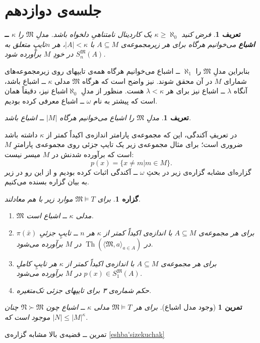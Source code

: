 \documentclass[12pt,a4paper]{report}
\theoremstyle{colorhead}
\newtheorem{tam}{تمرین}
\newtheorem{prop}[thm]{گزاره}
\newtheorem{defn}[thm]{تعریف}
\DeclareMathOperator{\Th}{Th}
\begin{document}
\section{جلسه‌ی دوازدهم}
\begin{defn}
فرض کنید
$\kappa\geq \aleph_0$
یک کاردینال نامتناهیِ دلخواه باشد. مدلِ
$\mathfrak{M}$
را 
\textbf{$\kappa$ 
ــ
اشباع }
می‌خوانیم هرگاه
برای هر زیرمجموعه‌ی
$A\subseteq M$
با
$|A|<\kappa$،
هر 
$n$تایپِ
متعلق به
$S_n^\mathfrak{M}(A)$
در خودِ
$M$
برآورده شود.
\end{defn}
بنابراین مدلِ
$\mathfrak{M}$
را
$\aleph_1$ 
ــ
اشباع می‌خوانیم هرگاه همه‌ی تایپهای روی زیرمجموعه‌های شمارای 
$M$
در آن محقق شوند. نیز واضح است که هرگاه
$\mathfrak{M}$
مدلی
$\kappa$ 
ــ 
اشباع باشد، آنگاه 
$\lambda$
ــ
اشباع نیز برای هر
$\lambda<\kappa$
هست. منظور از مدلِ 
$\aleph_0$اشباع
 نیز، دقیقاً همان است که پیشتر به نام
$\omega$
ــ
اشباع معرفی کرده‌ بودیم. 
\begin{defn}
مدلِ
$\mathfrak{M}$
را 
اشباع می‌خوانیم هرگاه
$|M|$
ــ‌
اشباع باشد.
\end{defn}
در تعریفِ
آکندگی، این که مجموعه‌ی پارامتر اندازه‌ی اکیداً
کمتر از
$\kappa$
داشته باشد ضروری است؛‌ برای مثال مجموعه‌ی زیر یک تایپ جزئی روی مجموعه‌ی پارامترِ
$M$
است که برآورده شدنش در 
$M$
میسر نیست:
\[
p(x)=\{x\not=m|m\in M\}.
\]
گزاره‌ای 
مشابه گزاره‌ی زیر  در بحثِ
$\omega$
ــ
آکندگی اثبات کرده بودیم و از این رو در زیر به بیان گزاره بسنده می‌کنیم.
\begin{prop}
برای
$\mathfrak{M}\models T$
موارد زیر با هم معادلند.
\begin{enumerate}
\item
$\mathfrak{M}$
مدلی 
$\kappa$ 
ــ 
اشباع است.
\item
برای هر مجموعه‌ی 
$A\subseteq M$
با اندازه‌ی اکیداً کمتر از
$\kappa$
هر
$n$ ــ
تایپِ جزئیِ
$\pi(\bar{x})$
در
$\Th(\langle\mathfrak{M},a\rangle_{a\in  A})$
در
$M$
برآورده می‌شود.
\item
برای هر مجموعه‌ی 
$A\subseteq M$
با اندازه‌ی اکیداً کمتر از
$\kappa$
هر تایپِ کاملِ
$p(x)\in S_1^\mathfrak{M}(A)$
در
$M$
برآورده می‌شود.
\item 
حکم شماره‌ی ۳ برای تایپهای جزئی تک‌متغیره.
\end{enumerate}
\end{prop}
\begin{tam}[وجود مدل اشباع]
برای هر
$\mathfrak{M}\models T$
مدلی 
$\kappa$
ــ
اشباع چون
$\mathfrak{N}\succ \mathfrak{M}$
چنان موجود است که 
$|N|\leq |M|^{\kappa}$.
\end{tam}
تمرین ــ‌ قضیه‌ی بالا مشابه گزاره‌ی
\ref{eshba'sizekuchak}
\end{document}
